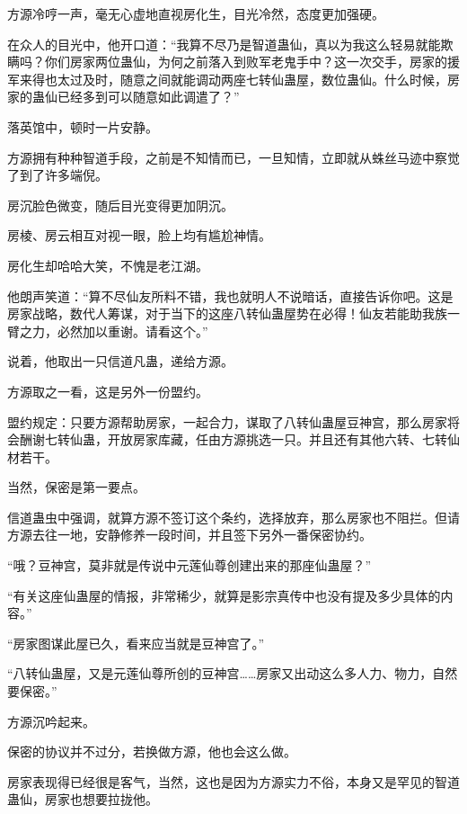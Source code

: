 
\begin{this_body}



方源冷哼一声，毫无心虚地直视房化生，目光冷然，态度更加强硬。

在众人的目光中，他开口道：“我算不尽乃是智道蛊仙，真以为我这么轻易就能欺瞒吗？你们房家两位蛊仙，为何之前落入到败军老鬼手中？这一次交手，房家的援军来得也太过及时，随意之间就能调动两座七转仙蛊屋，数位蛊仙。什么时候，房家的蛊仙已经多到可以随意如此调遣了？”

落英馆中，顿时一片安静。

方源拥有种种智道手段，之前是不知情而已，一旦知情，立即就从蛛丝马迹中察觉了到了许多端倪。

房沉脸色微变，随后目光变得更加阴沉。

房棱、房云相互对视一眼，脸上均有尴尬神情。

房化生却哈哈大笑，不愧是老江湖。

他朗声笑道：“算不尽仙友所料不错，我也就明人不说暗话，直接告诉你吧。这是房家战略，数代人筹谋，对于当下的这座八转仙蛊屋势在必得！仙友若能助我族一臂之力，必然加以重谢。请看这个。”

说着，他取出一只信道凡蛊，递给方源。

方源取之一看，这是另外一份盟约。

盟约规定：只要方源帮助房家，一起合力，谋取了八转仙蛊屋豆神宫，那么房家将会酬谢七转仙蛊，开放房家库藏，任由方源挑选一只。并且还有其他六转、七转仙材若干。

当然，保密是第一要点。

信道蛊虫中强调，就算方源不签订这个条约，选择放弃，那么房家也不阻拦。但请方源去往一地，安静修养一段时间，并且签下另外一番保密协约。

“哦？豆神宫，莫非就是传说中元莲仙尊创建出来的那座仙蛊屋？”

“有关这座仙蛊屋的情报，非常稀少，就算是影宗真传中也没有提及多少具体的内容。”

“房家图谋此屋已久，看来应当就是豆神宫了。”

“八转仙蛊屋，又是元莲仙尊所创的豆神宫……房家又出动这么多人力、物力，自然要保密。”

方源沉吟起来。

保密的协议并不过分，若换做方源，他也会这么做。

房家表现得已经很是客气，当然，这也是因为方源实力不俗，本身又是罕见的智道蛊仙，房家也想要拉拢他。


\end{this_body}
